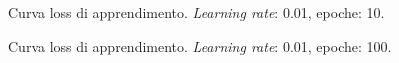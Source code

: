 \documentclass[a4paper,12pt]{article}
\begin{document}
\begin{figure}[htb]
\center
    \caption{Curva loss di apprendimento. \emph{Learning rate}: 0.01, epoche: 10.}
    \label{fig:loss10}
\end{figure}

\begin{figure}[htb]
\center
    \caption{Curva loss di apprendimento. \emph{Learning rate}: 0.01, epoche: 100.}
    \label{fig:loss100}
\end{figure}
\end{document}
